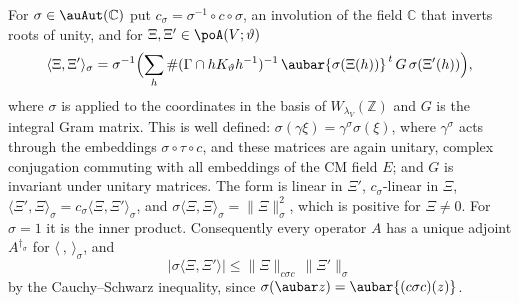 \documentclass[10pt]{amsart}
\theoremstyle{definition}
\theoremstyle{remark}
\newcommand{\C}{\mathbb C}
\newcommand{\Z}{\mathbb Z}
\begin{document}
For $\sigma\in\auAut(\C)$ put $c_\sigma=\sigma^{-1}\circ c\circ\sigma$, an involution of the field
$\C$ that inverts roots of unity, and for $\Xi,\Xi'\in\poA(V;\vartheta)$
\[
\langle\Xi,\Xi'\rangle_\sigma=\sigma^{-1}\Bigl(\sum_{h}\#(\Gamma\cap hK_\vartheta h^{-1})^{-1}\,
\aubar{\sigma(\Xi(h))}^{\,t}\,G\,\sigma(\Xi'(h))\Bigr),
\]
where $\sigma$ is applied to the coordinates in the basis of $W_{\lambda_V}(\Z)$ and $G$ is the
integral Gram matrix. This is well defined: $\sigma(\gamma\xi)=\gamma^\sigma\sigma(\xi)$, where
$\gamma^\sigma$ acts through the embeddings $\sigma\circ\tau\circ c$, and these matrices are again
unitary, complex conjugation commuting with all embeddings of the CM field $E$; and $G$ is
invariant under unitary matrices. The form is linear in $\Xi'$, $c_\sigma$-linear in $\Xi$,
$\langle\Xi',\Xi\rangle_\sigma=c_\sigma\langle\Xi,\Xi'\rangle_\sigma$, and
$\sigma\langle\Xi,\Xi\rangle_\sigma=\|\Xi\|_\sigma^2$, which is positive for $\Xi\ne0$. For
$\sigma=1$ it is the inner product. Consequently every operator $A$ has a unique adjoint
$A^{\dagger_\sigma}$ for $\langle\ ,\,\rangle_\sigma$, and
\begin{equation}\label{po:eq-cs}
\bigl|\sigma\langle\Xi,\Xi'\rangle\bigr|\le\|\Xi\|_{c\sigma c}\,\|\Xi'\|_\sigma
\end{equation}
by the Cauchy--Schwarz inequality, since $\sigma(\aubar z)=\aubar{(c\sigma c)(z)}$.
\end{document}
